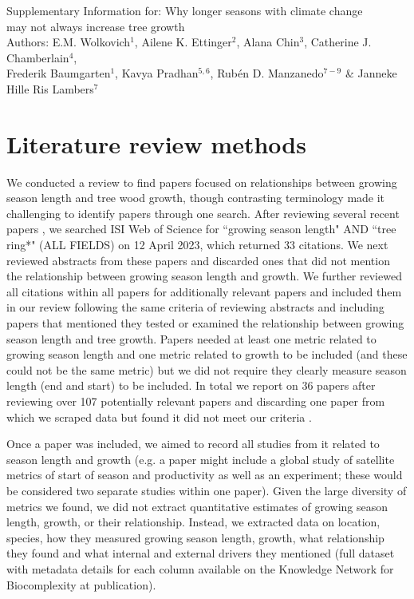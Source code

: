 \documentclass[11pt]{article}
\begin{document}
\renewcommand{\refname}{\CHead{}}

\begin{center}
{\sc Supplementary Information for:} {\Large Why longer seasons with climate change \\ may not always increase tree growth} \\
\vspace{5ex}
{\sc Authors:} E.M. Wolkovich$^1$, Ailene K. Ettinger$^2$, Alana Chin$^3$, Catherine J. Chamberlain$^4$,\\ Frederik Baumgarten$^1$, Kavya Pradhan$^{5,6}$, Rub{\'e}n D. Manzanedo$^{7-9}$ \&  Janneke Hille Ris Lambers$^7$
\end{center}

\renewcommand{\thetable}{S\arabic{table}}
\renewcommand{\thefigure}{S\arabic{figure}}


\section*{Literature review methods}

We conducted a review to find papers focused on relationships between growing season length and tree wood growth, though contrasting terminology made it challenging to identify papers through one search. After reviewing several recent papers \citep{dow2022warm,zohner2023effect}, we searched ISI Web of Science for ``growing season length" AND ``tree ring*" (ALL FIELDS) on 12 April 2023, which returned 33 citations. We next reviewed abstracts from these papers and discarded ones that did not mention the relationship between growing season length and growth. We further reviewed all citations within all papers for additionally relevant papers and included them in our review following the same criteria of reviewing abstracts and including papers that mentioned they tested or examined the relationship between growing season length and tree growth. Papers needed at least one metric related to growing season length and one metric related to growth to be included (and these could not be the same metric) but we did not require they clearly measure season length (end and start) to be included. In total we report on 36 papers after reviewing over 107 potentially relevant papers and discarding one paper from which we scraped data but found it did not meet our criteria \citep[][because it used tree rings as a metric of both growth and growing season length]{bruening2017}. 

Once a paper was included, we aimed to record all studies from it related to season length and growth (e.g. a paper might include a global study of satellite metrics of start of season and productivity as well as an experiment; these would be considered two separate studies within one paper). Given the large diversity of metrics we found, we did not extract quantitative estimates of growing season length, growth, or their relationship. Instead, we extracted data on location, species, how they measured growing season length, growth, what relationship they found and what internal and external drivers they mentioned (full dataset with metadata details for each column available on the Knowledge Network for Biocomplexity at publication). 
\end{document}
